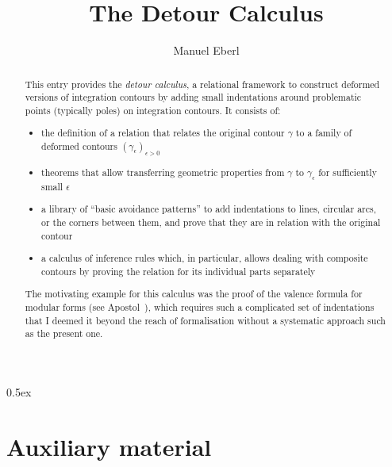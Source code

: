 \documentclass[11pt,a4paper]{article}
\begin{document}
\title{The Detour Calculus}
\author{Manuel Eberl}
\maketitle

\begin{abstract}
This entry provides the \emph{detour calculus}, a relational framework to construct deformed versions of integration contours
by adding small indentations around problematic points (typically poles) on integration contours. It consists of:
\begin{itemize}
\item the definition of a relation that relates the original contour $\gamma$ to a family of deformed contours $(\gamma_\epsilon)_{\epsilon > 0}$
\item theorems that allow transferring geometric properties from $\gamma$ to $\gamma_\epsilon$ for sufficiently small $\epsilon$
\item a library of ``basic avoidance patterns'' to add indentations to lines, circular arcs, or the corners between them, and prove that they are in relation with the original contour
\item a calculus of inference rules which, in particular, allows dealing with composite contours by proving the relation for its individual parts separately
\end{itemize}
The motivating example for this calculus was the proof of the valence formula for modular forms (see Apostol~\cite[Section~6.3]{apostol90}), which requires such a complicated set of indentations that I deemed it beyond the reach of formalisation without a systematic approach such as the present one.
\end{abstract}

\newpage

\tableofcontents

\newpage
\parindent 0pt\parskip 0.5ex

\section{Auxiliary material}



\raggedright



\end{document}

